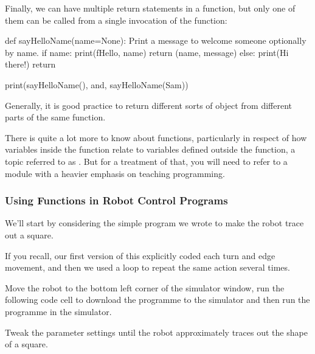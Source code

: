 \documentclass[letterpaper,10pt,english]{sphinxmanual}
\begin{document}
Finally, we can have multiple return statements in a function, but only one of them can be called from a single invocation of the function:

{
\begin{sphinxVerbatim}[commandchars=\\\{\}]
\llap{\color{nbsphinxin}[ ]:\,\hspace{\fboxrule}\hspace{\fboxsep}}def sayHelloName(name=None):
    \PYGZdq{}\PYGZdq{}\PYGZdq{}Print a message to welcome someone optionally by name.\PYGZdq{}\PYGZdq{}\PYGZdq{}
    if name:
        print(f\PYGZdq{}Hello, \PYGZob{}name\PYGZcb{}\PYGZdq{})
        return (name, message)
    else:
        print(\PYGZdq{}Hi there!\PYGZdq{})
    return

print(sayHelloName(), \PYGZsq{}and\PYGZsq{}, sayHelloName(\PYGZdq{}Sam\PYGZdq{}))
\end{sphinxVerbatim}
}

Generally, it is  good practice to return different sorts of object from different parts of the same function.

There is quite a lot more to know about functions, particularly in respect of how variables inside the function relate to variables defined outside the function, a topic referred to as . But for a treatment of that, you will need to refer to a module with a heavier emphasis on teaching programming.


\subsubsection{Using Functions in Robot Control Programs}
\label{\detokenize{content/03_Robot_Lab/Section_00_05:Using-Functions-in-Robot-Control-Programs}}
We’ll start by considering the simple program we wrote to make the robot trace out a square.

If you recall, our first version of this explicitly coded each turn and edge movement, and then we used a loop to repeat the same action several times.

Move the robot to the bottom left corner of the simulator window, run the following code cell to download the programme to the simulator and then run the programme in the simulator.

Tweak the parameter settings until the robot approximately traces out the shape of a square.
\end{document}
